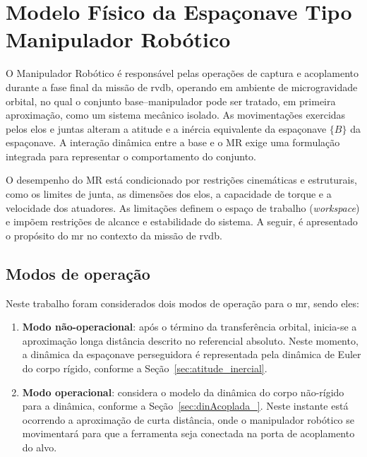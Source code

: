 \section{Modelo Físico da Espaçonave Tipo Manipulador Robótico}
\label{sec:manipulador_robotico}

O Manipulador Robótico é responsável pelas operações de captura e acoplamento durante a fase final da missão de \gls{rvdb}, operando em ambiente de microgravidade orbital, no qual o conjunto base--manipulador pode ser tratado, em primeira aproximação, como um sistema mecânico isolado.
As movimentações exercidas pelos elos e juntas alteram a atitude e a inércia equivalente da espaçonave $\{B\}$ da espaçonave.
A interação dinâmica entre a base e o MR exige uma formulação integrada para representar o comportamento do conjunto.

O desempenho do MR está condicionado por restrições cinemáticas e estruturais, como os limites de junta, as dimensões dos elos, a capacidade de torque e a velocidade dos atuadores.
As limitações definem o espaço de trabalho (\emph{workspace}) e impõem restrições de alcance e estabilidade do sistema.
A seguir, é apresentado o propósito do \gls{mr} no contexto da missão de \gls{rvdb}.

\subsection{Modos de operação}
\label{sec:MR_modos_operacao}

Neste trabalho foram considerados dois modos de operação para o \gls{mr}, sendo eles:
\begin{enumerate}[label=(\roman*)]
  \item \textbf{Modo não-operacional}: após o término da transferência orbital, inicia-se a aproximação longa distância descrito no referencial absoluto. Neste momento, a dinâmica da espaçonave perseguidora é representada pela dinâmica de Euler do corpo rígido, conforme a Seção~\ref{sec:atitude_inercial}.
  \item \textbf{Modo operacional}: considera o modelo da dinâmica do corpo não-rígido para a dinâmica, conforme a Seção~\ref{sec:dinAcoplada_}. Neste instante está ocorrendo a aproximação de curta distância, onde o manipulador robótico se movimentará para que a ferramenta seja conectada na porta de acoplamento do alvo.
\end{enumerate}



